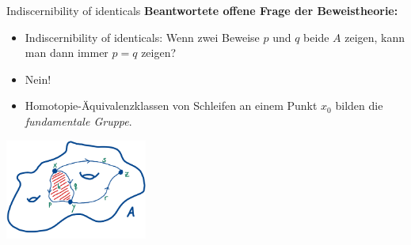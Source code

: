 \documentclass[11pt,aspectratio=169,notheorems]{beamer}
\begin{document}
\begin{frame}{\glqq{}Indiscernibility of identicals\grqq{}}
    \textbf{Beantwortete offene Frage der Beweistheorie:}
    \begin{itemize}
        \item \glqq{}Indiscernibility of identicals\grqq{}: Wenn zwei Beweise $p$ und $q$ beide $A$ zeigen, kann man dann immer $p = q$ zeigen?
        \item Nein!
        \item Homotopie-Äquivalenzklassen von Schleifen an einem Punkt $x_0$ bilden die \emph{fundamentale Gruppe}.
    \end{itemize}
    \begin{center}
        \includegraphics[width=0.35\textwidth]{images/topology1.pdf}
    \end{center}
\end{frame}
\end{document}
